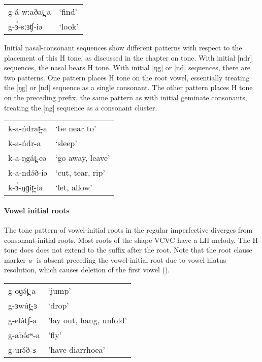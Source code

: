 \ea 
\begin{tabular}[t]{ll}
g-á-w:aðat̪-a	&	`find' \\ 
g-ɜ́-sːɜʧ-iə		&	`look'\\	
\end{tabular}
\z 


Initial nasal-consonant sequences show different patterns with respect to the placement of this H tone, as discussed in the chapter on tone. With initial [ndr] sequences, the nasal bears H tone. With initial [ŋg] or [nd] sequences, there are two patterns. One pattern places H tone on the root vowel, essentially treating the [ŋg] or [nd] sequence as a single consonant. The other pattern places H tone on the preceding prefix, the same pattern as with initial geminate consonants, treating the [ng] sequence as a consonant cluster. %

\ea 
\begin{tabular}[t]{ll}
k-a-ńdrat̪-a	&	`be near to'\\
k-a-ńdr-a	&	`sleep'\\
k-a-ŋgát̪-eə	&	`go away, leave'\\
k-a-ndə́ð-iə	&	`cut, tear, rip'\\
k-ɜ́-ŋɡit̪-iə	&	`let, allow'\\	
\end{tabular}
\z 

\paragraph{Vowel initial roots} \label{sec:ch11:vcipfv} The tone pattern of vowel-initial roots in the regular imperfective diverges from consonant-initial roots. Most roots of the shape VCVC have a LH melody. The H tone does does not extend to the suffix after the root. Note that the root clause marker \textit{a-} is absent preceding the vowel-initial root due to vowel hiatus resolution, which causes deletion of the first vowel ().

\ea 
\begin{tabular}[t]{ll}
g-oɡə́t̪-a		&	‘jump’\\
g-ɜwút̪-ɜ	&	‘drop’\\
g-elə́tʃ-a	&	'lay out, hang, unfold'\\
g-abə́ɾʷ-a	&	'fly'\\
g-uɾə́ð-ɜ		&	'have diarrhoea'\\	
\end{tabular}
\z 


